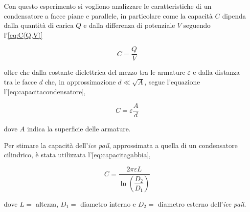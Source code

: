 {\fontsize{12}{14}\selectfont
Con questo esperimento si vogliono analizzare le caratteristiche di un condensatore a facce piane e parallele, in particolare come la capacità $C$ dipenda dalla quantità di carica $Q$ e dalla differenza di potenziale $V$ seguendo l'\autoref{eq:C(Q,V)}

\begin{equation} \label{eq:C(Q,V)}
    C = \frac{Q}{V}
\end{equation}

oltre che dalla costante dielettrica del mezzo tra le armature $\varepsilon$ e dalla distanza tra le facce $d$ che, in approssimazione $d \ll \sqrt{A}$, segue l'equazione l'\autoref{eq:capacitacondensatore},

\begin{equation} \label{eq:capacitacondensatore}
    C = \varepsilon \frac{A}{d}
\end{equation}

dove $A$ indica la superficie delle armature.

Per stimare la capacità dell'\emph{ice pail}, approssimata a quella di un condensatore cilindrico, è stata utilizzata l'\autoref{eq:capacitagabbia}, 

\begin{equation} \label{eq:capacitagabbia}
    C = \dfrac{2 \pi \varepsilon L}{\ln{\left(\dfrac{D_2}{D_1}\right)}}
\end{equation}

dove $L =$ altezza, $D_1 =$ diametro interno e $D_2 =$ diametro esterno dell'\emph{ice pail}.
\par}
